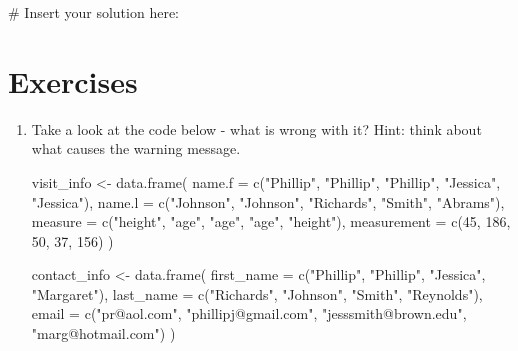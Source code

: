 \documentclass[
  letterpaper,
]{krantz}
\makeatletter
\newenvironment{Shaded}{\begin{snugshade}}{\end{snugshade}}
\newcommand{\AttributeTok}[1]{\textcolor[rgb]{0.40,0.45,0.13}{#1}}
\newcommand{\CommentTok}[1]{\textcolor[rgb]{0.37,0.37,0.37}{#1}}
\newcommand{\DecValTok}[1]{\textcolor[rgb]{0.68,0.00,0.00}{#1}}
\newcommand{\FunctionTok}[1]{\textcolor[rgb]{0.28,0.35,0.67}{#1}}
\newcommand{\NormalTok}[1]{\textcolor[rgb]{0.00,0.23,0.31}{#1}}
\newcommand{\OtherTok}[1]{\textcolor[rgb]{0.00,0.23,0.31}{#1}}
\newcommand{\StringTok}[1]{\textcolor[rgb]{0.13,0.47,0.30}{#1}}
\newenvironment{kframe}{%
\medskip{}
\setlength{\fboxsep}{.8em}
 \def\at@end@of@kframe{}%
 \ifinner\ifhmode%
  \def\at@end@of@kframe{\end{minipage}}%
  \begin{minipage}{\columnwidth}%
 \fi\fi%
 \def\FrameCommand##1{\hskip\@totalleftmargin \hskip-\fboxsep
 \colorbox{shadecolor}{##1}\hskip-\fboxsep
     \hskip-\linewidth \hskip-\@totalleftmargin \hskip\columnwidth}%
 \MakeFramed {\advance\hsize-\width
   \@totalleftmargin\z@ \linewidth\hsize
   \@setminipage}}%
 {\par\unskip\endMakeFramed%
 \at@end@of@kframe}
\renewenvironment{Shaded}{\begin{kframe}}{\end{kframe}}
\makeatother
\begin{document}
\begin{Shaded}
\begin{Highlighting}[]
\CommentTok{\# Insert your solution here:}
\end{Highlighting}
\end{Shaded}

\hypertarget{exercises-4}{%
\section{Exercises}\label{exercises-4}}

\begin{enumerate}
\def\labelenumi{\arabic{enumi}.}
\item
  Take a look at the code below - what is wrong with it? Hint: think
  about what causes the warning message.

\begin{Shaded}
\begin{Highlighting}[]
\NormalTok{visit\_info }\OtherTok{\textless{}{-}} \FunctionTok{data.frame}\NormalTok{(}
  \AttributeTok{name.f =} \FunctionTok{c}\NormalTok{(}\StringTok{"Phillip"}\NormalTok{, }\StringTok{"Phillip"}\NormalTok{, }\StringTok{"Phillip"}\NormalTok{, }\StringTok{"Jessica"}\NormalTok{, }\StringTok{"Jessica"}\NormalTok{),}
  \AttributeTok{name.l =} \FunctionTok{c}\NormalTok{(}\StringTok{"Johnson"}\NormalTok{, }\StringTok{"Johnson"}\NormalTok{, }\StringTok{"Richards"}\NormalTok{, }\StringTok{"Smith"}\NormalTok{, }\StringTok{"Abrams"}\NormalTok{),}
  \AttributeTok{measure =} \FunctionTok{c}\NormalTok{(}\StringTok{"height"}\NormalTok{, }\StringTok{"age"}\NormalTok{, }\StringTok{"age"}\NormalTok{, }\StringTok{"age"}\NormalTok{, }\StringTok{"height"}\NormalTok{),}
  \AttributeTok{measurement =} \FunctionTok{c}\NormalTok{(}\DecValTok{45}\NormalTok{, }\DecValTok{186}\NormalTok{, }\DecValTok{50}\NormalTok{, }\DecValTok{37}\NormalTok{, }\DecValTok{156}\NormalTok{)}
\NormalTok{)}

\NormalTok{contact\_info }\OtherTok{\textless{}{-}} \FunctionTok{data.frame}\NormalTok{(}
\AttributeTok{first\_name =} \FunctionTok{c}\NormalTok{(}\StringTok{"Phillip"}\NormalTok{, }\StringTok{"Phillip"}\NormalTok{, }\StringTok{"Jessica"}\NormalTok{, }\StringTok{"Margaret"}\NormalTok{),}
\AttributeTok{last\_name =} \FunctionTok{c}\NormalTok{(}\StringTok{"Richards"}\NormalTok{, }\StringTok{"Johnson"}\NormalTok{, }\StringTok{"Smith"}\NormalTok{, }\StringTok{"Reynolds"}\NormalTok{),}
\AttributeTok{email =} \FunctionTok{c}\NormalTok{(}\StringTok{"pr@aol.com"}\NormalTok{, }\StringTok{"phillipj@gmail.com"}\NormalTok{, }\StringTok{"jesssmith@brown.edu"}\NormalTok{, }
      \StringTok{"marg@hotmail.com"}\NormalTok{)}
\NormalTok{)}


\end{Highlighting}
\end{Shaded}
\end{enumerate}
\end{document}
